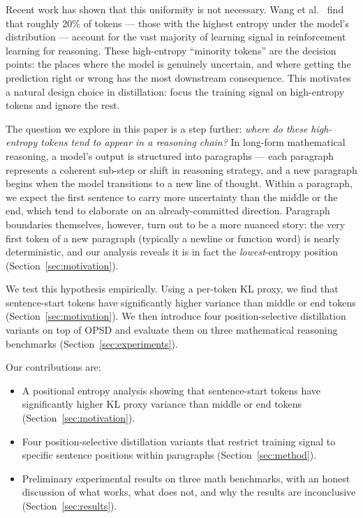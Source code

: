 \documentclass{article}
\begin{document}
Recent work has shown that this uniformity is not necessary.
Wang et al.~\cite{wang2026beyond} find that roughly 20\% of tokens — those with the highest entropy under the model's distribution — account for the vast majority of learning signal in reinforcement learning for reasoning.
These high-entropy ``minority tokens'' are the decision points: the places where the model is genuinely uncertain, and where getting the prediction right or wrong has the most downstream consequence.
This motivates a natural design choice in distillation: focus the training signal on high-entropy tokens and ignore the rest.

The question we explore in this paper is a step further: \emph{where do these high-entropy tokens tend to appear in a reasoning chain?}
In long-form mathematical reasoning, a model's output is structured into paragraphs — each paragraph represents a coherent sub-step or shift in reasoning strategy, and a new paragraph begins when the model transitions to a new line of thought.
Within a paragraph, we expect the first sentence to carry more uncertainty than the middle or the end, which tend to elaborate on an already-committed direction.
Paragraph boundaries themselves, however, turn out to be a more nuanced story: the very first token of a new paragraph (typically a newline or function word) is nearly deterministic, and our analysis reveals it is in fact the \emph{lowest}-entropy position (Section~\ref{sec:motivation}).

We test this hypothesis empirically.
Using a per-token KL proxy, we find that sentence-start tokens have significantly higher variance than middle or end tokens (Section~\ref{sec:motivation}).
We then introduce four position-selective distillation variants on top of OPSD and evaluate them on three mathematical reasoning benchmarks (Section~\ref{sec:experiments}).

Our contributions are:
\begin{itemize}
    \item A positional entropy analysis showing that sentence-start tokens have significantly higher KL proxy variance than middle or end tokens (Section~\ref{sec:motivation}).
    \item Four position-selective distillation variants that restrict training signal to specific sentence positions within paragraphs (Section~\ref{sec:method}).
    \item Preliminary experimental results on three math benchmarks, with an honest discussion of what works, what does not, and why the results are inconclusive (Section~\ref{sec:results}).
\end{itemize}
\end{document}
